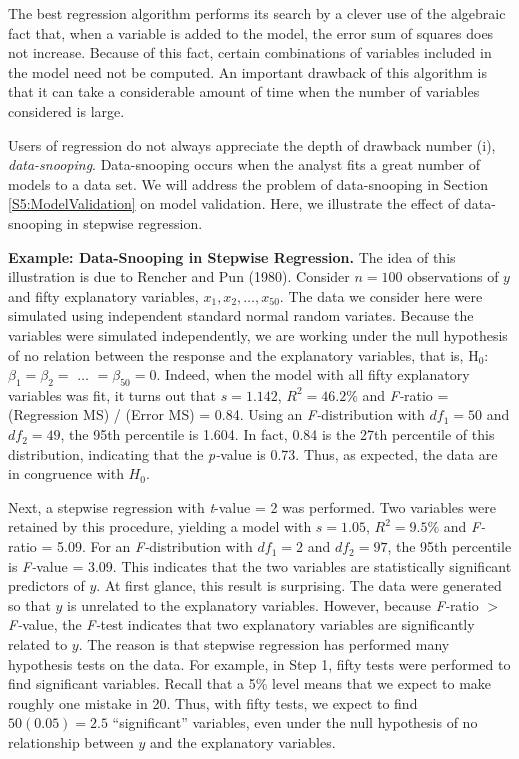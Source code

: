 The best regression algorithm performs its search by a clever use of
the algebraic fact that, when a variable is added to the model, the
error sum of squares does not increase. Because of this fact,
certain combinations of variables included in the model need not be
computed. An important drawback of this algorithm is that it can
take a considerable amount of time when the number of variables
considered is large.

Users of regression do not always appreciate the depth of drawback
number (i), \textit{data-snooping}. Data-snooping occurs when the
analyst fits a great number of models to a data set. We will address
the problem of data-snooping in Section \ref{S5:ModelValidation} on
model validation. Here, we illustrate the effect of data-snooping in
stepwise regression.

\linejed{}

\textbf{Example: Data-Snooping in Stepwise
Regression.} The
idea of this illustration is due to Rencher and Pun (1980). Consider
$n=100$ observations of $y$ and fifty explanatory variables, $x_1,
x_2, \ldots,x_{50}$. The data we consider here were simulated using
independent standard normal random variates. Because the variables
were simulated independently, we are working under the null
hypothesis of no relation between the response and the explanatory
variables, that is, H$_0$: $\beta_1=\beta_2=$ $\ldots$
$=\beta_{50}=0$. Indeed, when the model with all
fifty explanatory variables was fit, it turns out that $s=1.142$, $%
R^2=46.2\%$ and \textit{F-}ratio = (Regression MS) / (Error MS) =
0.84. Using an \textit{F-}distribution with $df_1=50$ and $df_2=49$,
the 95th percentile is 1.604. In fact, 0.84 is the 27th percentile
of this distribution, indicating that the \textit{p-}value is 0.73.
Thus, as expected, the data are in congruence with $H_0$.

Next, a stepwise regression with \textit{t}-value = 2 was performed. Two
variables were retained by this procedure, yielding a model with $s=1.05$, $%
R^2=9.5\%$ and \textit{F-}ratio = 5.09. For an
\textit{F-}distribution with $df_1=2$ and $df_2=97$, the 95th
percentile is \textit{F-}value = 3.09. This indicates that the two
variables are statistically significant predictors of $y$. At first
glance, this result is surprising. The data were generated so
that $y$ is unrelated to the explanatory variables. However, because \textit{%
F-}ratio $>$ \textit{F-}value, the \textit{F-}test indicates that
two explanatory variables are significantly related to $y$. The
reason is that stepwise regression has performed many hypothesis
tests on the data. For example, in Step 1, fifty tests were
performed to find significant variables. Recall that a 5\% level
means that we expect to make roughly one mistake in 20. Thus, with
fifty tests, we expect to find $50(0.05)=2.5$ ``significant''
variables, even under the null hypothesis of no relationship between
$y$ and the explanatory variables.

